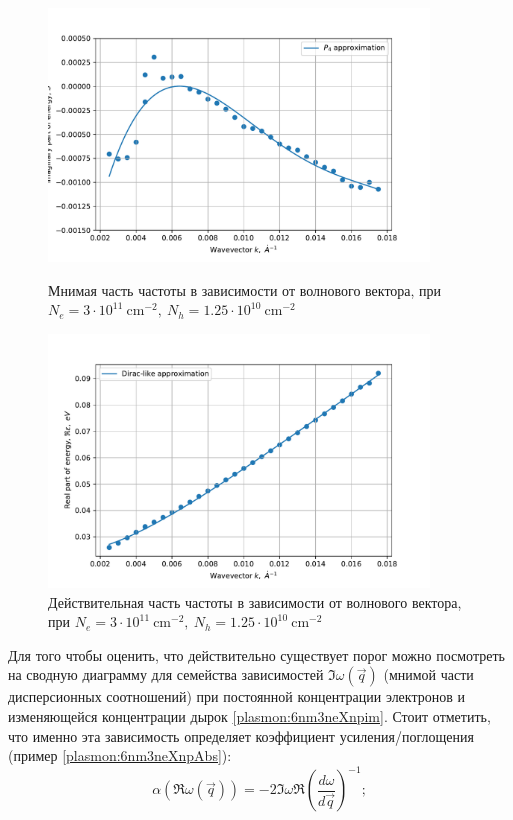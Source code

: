 \documentclass[../main.tex]{subfiles}
\begin{document}
    \begin{figure}[h]
        \begin{minipage}[h]{0.49\textwidth}
            \includegraphics[width=0.9\textwidth]{./images/plasmon_6nm_3_0125_im.pdf}
            \caption{Мнимая часть частоты в зависимости от волнового вектора, при $N_e = 3 \cdot 10^{11}~\text{cm}^{-2},~N_h = 1.25 \cdot 10^{10}~\text{cm}^{-2}$
            \label{plasmon:6nm3ne0125npim}}
        \end{minipage}
        \hfill
        \begin{minipage}[h]{0.49\textwidth}
            \includegraphics[width=0.9\textwidth]{./images/plasmon_6nm_3_0125_re.pdf}
            \caption{Действительная часть частоты в зависимости от волнового вектора, при $N_e = 3 \cdot 10^{11}~\text{cm}^{-2},~N_h = 1.25 \cdot 10^{10}~\text{cm}^{-2}$
            \label{plasmon:6nm3ne0125npre}}
        \end{minipage}
    \end{figure}

    Для того чтобы оценить, что действительно существует порог можно посмотреть на сводную диаграмму для семейства зависимостей $\Im \omega(\vec q)$
    (мнимой части дисперсионных соотношений) при постоянной концентрации электронов и изменяющейся концентрации дырок \ref{plasmon:6nm3neXnpim}.
    Стоит отметить, что именно эта зависимость определяет коэффициент усиления/поглощения
    (пример \ref{plasmon:6nm3neXnpAbs}):
    \begin{equation}
        \alpha(\Re \omega (\vec q)) = -2 \Im \omega \Re \left(\frac{d\omega}{d\vec q}\right)^{-1};
    \end{equation}
\end{document}
